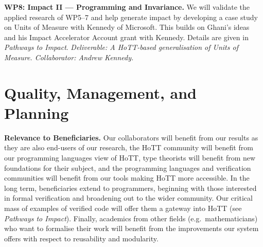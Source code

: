 \documentclass[a4paper,11pt]{article}
\begin{document}
{\bf WP8: Impact II --- Programming and Invariance.}  We will validate
the applied research of WP5--7 and help generate impact by developing a
case study on Units of Measure with Kennedy of Microsoft. This builds
on Ghani's ideas~\cite{uom} and his Impact Accelerator Account grant
with Kennedy. Details are given in {\em Pathways to Impact}. {\em
  Deliverable: A HoTT-based generalisation of Units of
  Measure. Collaborator: Andrew Kennedy.  }


\vspace*{-0.2in}

\section{Quality, Management, and Planning}

\vspace*{-0.1in}

{\bf Relevance to Beneficiaries.} Our collaborators will benefit from
our results as they are also end-users of our research, the HoTT
community will benefit from our programming languages view of HoTT,
type theorists will benefit from new foundations for their subject,
and the programming languages and verification communities will
benefit from our tools making HoTT more accessible.  In the long term,
beneficiaries extend to programmers, beginning with those interested
in formal verification and broadening out to the wider community. Our
critical mass of examples of verified code will offer them a gateway
into HoTT (see {\em Pathways to Impact}). Finally, academics from
other fields (e.g.\ mathematicians) who want to formalise their work
will benefit from the improvements our system offers with respect to
reusability and modularity. %





 
\end{document}
